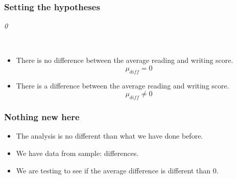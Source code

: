 \documentclass[slidestop,compress,mathserif]{beamer}
\newcommand{\soln}[1]{\textit{#1}}
\begin{document}
\begin{frame}
\frametitle{Setting the hypotheses}


\pause

\soln{0}

$\:$ \\

\pause


\pause

\begin{itemize}
\item[$H_0$:] There is no difference between the average reading and writing score. 
\[ \mu_{diff} = 0 \]
\item[$H_A$:] There is a difference between the average reading and writing score. 
\[ \mu_{diff} \ne 0 \]
\end{itemize}

\end{frame}


\begin{frame}
\frametitle{Nothing new here}

\begin{itemize}

\item The analysis is no different than what we have done before.

\item We have data from  sample: differences. 

\item We are testing to see if the average difference is different than 0.

\end{itemize}

\end{frame}



\end{document}
